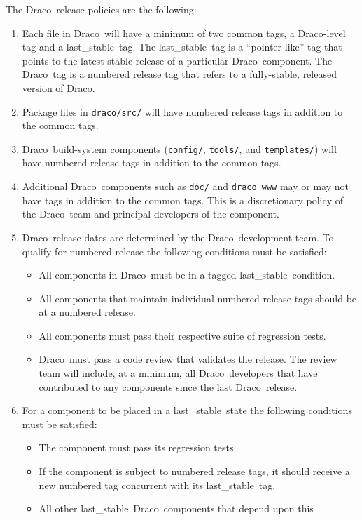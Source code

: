 \documentclass[11pt]{nmemo}
\newcommand{\draco}{{\normalfont\normalsize\sffamily Draco}}
\newcommand{\stable}{{\normalfont\normalsize\ttfamily last\_stable}}
\begin{document}
The \draco\ release policies are the following:
\begin{enumerate}
\item Each file in \draco\ will have a minimum of two common tags, a
  \draco-level tag and a \stable\ tag.  The \stable\ tag is a
  ``pointer-like'' tag that points to the latest stable release of a
  particular \draco\ component.  The \draco\ tag is a numbered release
  tag that refers to a fully-stable, released version of \draco.
\item Package files in \texttt{draco/src/} will have numbered release
  tags in addition to the common tags.
\item \draco\ build-system components (\texttt{config/},
  \texttt{tools/}, and \texttt{templates/}) will have numbered release
  tags in addition to the common tags.
\item Additional \draco\ components such as \texttt{doc/} and
  \texttt{draco\_www} may or may not have tags in addition to the
  common tags.  This is a discretionary policy of the \draco\ team and 
  principal developers of the component.
\item \draco\ release dates are determined by the \draco\ development
  team.  To qualify for numbered release the following conditions must 
  be satisfied:
  \begin{itemize}
  \item All components in \draco\ must be in a tagged \stable\
    condition.
  \item All components that maintain individual numbered release tags
    should be at a numbered release.
  \item All components must pass their respective suite of
    regression tests.
  \item \draco\ must pass a code review that validates the release.
    The review team will include, at a minimum, all \draco\ developers
    that have contributed to any components since the last \draco\ 
    release.
  \end{itemize}
\item For a component to be placed in a \stable\ state the
  following conditions must be satisfied:
  \begin{itemize}
  \item The component must pass its regression tests.
  \item If the component is subject to numbered release tags, it
    should receive a new numbered tag concurrent with its \stable\ 
    tag. 
  \item All other \stable\ \draco\ components that depend upon this

\end{itemize}
\end{enumerate}
\end{document}
